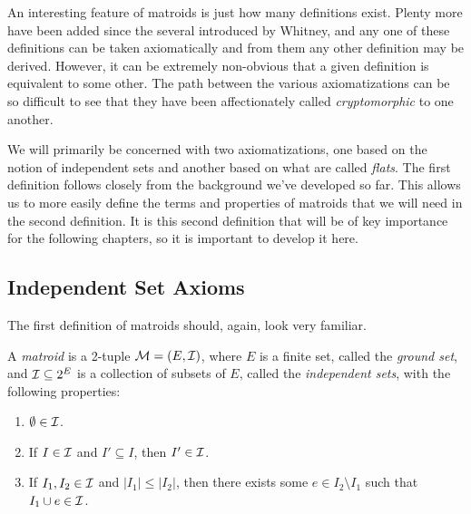 \documentclass[12pt,oneside]{../../sfsuthesis}
\begin{document}
An interesting feature of matroids is just how many definitions exist.
Plenty more have been added since the several introduced by Whitney, and
any one of these definitions can be taken axiomatically and from them any other definition may be derived.
However, it can be extremely non-obvious that a given definition is equivalent to some other.
The path between the various axiomatizations can be so difficult to see that they have been affectionately called \textit{cryptomorphic} to one another.

We will primarily be concerned with two axiomatizations, one based on the notion of independent sets and another based on what are called \emph{flats}.
The first definition follows closely from the background we've developed so far.
This allows us to more easily define the terms and properties of matroids that we will need in the second definition.
It is this second definition that will be of key importance for the following chapters, so it is important to develop it here.

\subsection{Independent Set Axioms}

The first definition of matroids should, again, look very familiar.

\begin{definition}\th\label{def:MatroidIndpendentAxioms}
    A \emph{matroid} is a 2-tuple  \( \mathcal{M} = (E, \mathcal{I}) \), where \( E \) is a finite set, called the \emph{ground set}, and \( \mathcal{I} \subseteq 2^E \) is a collection of subsets of \( E \), called the \emph{independent sets}, with the following properties:
    \begin{enumerate}[label=(I\arabic*)]
        \item \( \emptyset \in \mathcal{I} \).
        \item If \( I \in \mathcal{I} \) and \( I' \subseteq I \), then \( I' \in \mathcal{I} \).
        \item If \( I_1, I_2 \in \mathcal{I} \) and \( |I_1| \leq |I_2|\), then there exists some \( e \in I_2 \setminus I_1 \)
              such that \( I_1 \cup e \in \mathcal{I} \).
    \end{enumerate}
\end{definition}
\end{document}

